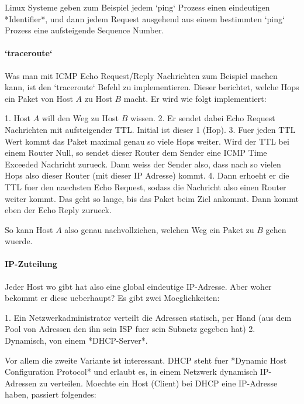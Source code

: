 Linux Systeme geben zum Beispiel jedem `ping` Prozess einen eindeutigen
*Identifier*, und dann jedem Request ausgehend aus einem bestimmten `ping`
Prozess eine aufsteigende Sequence Number.

\paragraph{`traceroute`} 

Was man mit ICMP Echo Request/Reply Nachrichten zum Beispiel machen kann, ist
den `traceroute` Befehl zu implementieren. Dieser berichtet, welche Hops ein
Paket von Host $A$ zu Host $B$ macht. Er wird wie folgt implementiert:

1. Host $A$ will den Weg zu Host $B$ wissen.
2. Er sendet dabei Echo Request Nachrichten mit aufsteigender TTL. Initial ist
   dieser 1 (Hop).
3. Fuer jeden TTL Wert kommt das Paket maximal genau so viele Hops weiter. Wird
   der TTL bei einem Router Null, so sendet dieser Router dem Sender eine ICMP
   Time Exceeded Nachricht zurueck. Dann weiss der Sender also, dass nach so
   vielen Hops also dieser Router (mit dieser IP Adresse) kommt.
4. Dann erhoeht er die TTL fuer den naechsten Echo Request, sodass die Nachricht
   also einen Router weiter kommt. Das geht so lange, bis das Paket beim Ziel
   ankommt. Dann kommt eben der Echo Reply zurueck.

So kann Host $A$ also genau nachvollziehen, welchen Weg ein Paket zu $B$ gehen
wuerde.

\paragraph{IP-Zuteilung} 

Jeder Host wo gibt hat also eine global eindeutige IP-Adresse. Aber woher
bekommt er diese ueberhaupt? Es gibt zwei Moeglichkeiten:

1. Ein Netzwerkadministrator verteilt die Adressen statisch, per Hand (aus dem
   Pool von Adressen den ihn sein ISP fuer sein Subnetz gegeben hat)
2. Dynamisch, von einem *DHCP-Server*.

Vor allem die zweite Variante ist interessant. DHCP steht fuer *Dynamic Host
Configuration Protocol* und erlaubt es, in einem Netzwerk dynamisch IP-Adressen
zu verteilen. Moechte ein Host (Client) bei DHCP eine IP-Adresse haben, passiert
folgendes:

